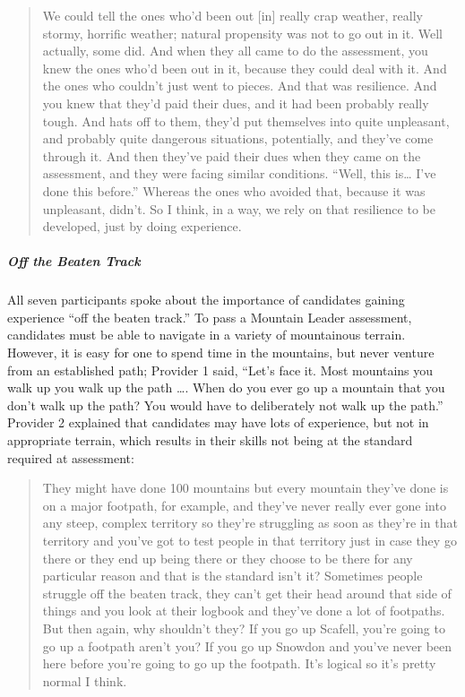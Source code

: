 \documentclass[
  12pt,
  a4paper,
]{book}
\begin{document}
\begin{quote}
We could tell the ones who'd been out {[}in{]} really crap weather, really stormy, horrific weather; natural propensity was not to go out in it. Well actually, some did. And when they all came to do the assessment, you knew the ones who'd been out in it, because they could deal with it. And the ones who couldn't just went to pieces. And that was resilience. And you knew that they'd paid their dues, and it had been probably really tough. And hats off to them, they'd put themselves into quite unpleasant, and probably quite dangerous situations, potentially, and they've come through it. And then they've paid their dues when they came on the assessment, and they were facing similar conditions. ``Well, this is\ldots{} I've done this before.'' Whereas the ones who avoided that, because it was unpleasant, didn't. So I think, in a way, we rely on that resilience to be developed, just by doing experience.
\end{quote}

\hypertarget{qual-off-the-beaten-track}{%
\subparagraph{Off the Beaten Track}\label{qual-off-the-beaten-track}}

All seven participants spoke about the importance of candidates gaining experience ``off the beaten track.'' To pass a Mountain Leader assessment, candidates must be able to navigate in a variety of mountainous terrain. However, it is easy for one to spend time in the mountains, but never venture from an established path; Provider 1 said, ``Let's face it. Most mountains you walk up you walk up the path \ldots. When do you ever go up a mountain that you don't walk up the path? You would have to deliberately not walk up the path.'' Provider 2 explained that candidates may have lots of experience, but not in appropriate terrain, which results in their skills not being at the standard required at assessment:

\begin{quote}
They might have done 100 mountains but every mountain they've done is on a major footpath, for example, and they've never really ever gone into any steep, complex territory so they're struggling as soon as they're in that territory and you've got to test people in that territory just in case they go there or they end up being there or they choose to be there for any particular reason and that is the standard isn't it? Sometimes people struggle off the beaten track, they can't get their head around that side of things and you look at their logbook and they've done a lot of footpaths. But then again, why shouldn't they? If you go up Scafell, you're going to go up a footpath aren't you? If you go up Snowdon and you've never been here before you're going to go up the footpath. It's logical so it's pretty normal I think.
\end{quote}
\end{document}
